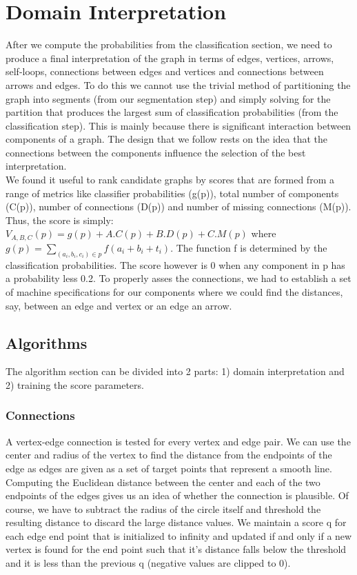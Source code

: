 \section{Domain Interpretation}

After we compute the probabilities from the classification section, we need to produce a final interpretation of the graph in terms of edges, vertices, arrows, self-loops, connections between edges and vertices and connections between arrows and edges. To do this we cannot use the trivial method of partitioning the graph into segments (from our segmentation step) and  simply solving for the partition that produces the largest sum of classification probabilities (from the classification step). This is mainly because there is significant interaction between components of a graph. The design that we follow rests on the idea that the connections between the components influence the selection of the best interpretation.\\

We found it useful to rank candidate graphs by scores that are formed from a range of metrics like classifier probabilities (g(p)), total number of components (C(p)), number of connections (D(p)) and number of missing connections (M(p)). Thus, the score is simply: $V_{A,B,C}(p) = g(p) + A.C(p) + B.D(p) + C.M(p)$ where $g(p) = \sum_{(a_i,b_i,c_i) \in p}f(a_i+b_i+t_i)$. The function f is determined by the  classification probabilities. The score however is 0 when any component in p has a probability less 0.2. To properly asses the connections, we had to establish a set of machine specifications for our components where we could find the distances, say, between an edge and vertex or an edge an arrow.\\

\subsection{Algorithms}

The algorithm section can be divided into 2 parts: 1) domain interpretation and 2) training the score parameters.\\

\subsubsection{Connections}

A vertex-edge connection is tested for every vertex and edge pair. We can use the center and radius of the vertex to find the distance from the endpoints of the edge as edges are given as a set of target points that represent a smooth line. Computing the Euclidean distance between the center and each of the two endpoints of the edges gives us an idea of whether the connection is plausible. Of course, we have to subtract the radius of the circle itself and threshold the resulting distance to discard the large distance values. We maintain a score q for each edge end point that is initialized to infinity and updated if and only if a new vertex is found for the end point such that it's distance falls below the threshold and it is less than the previous q (negative values are clipped to 0).\\

